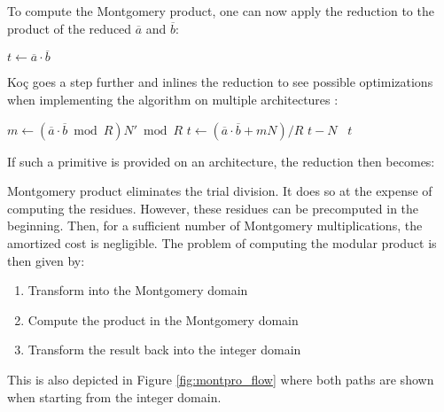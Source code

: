 To compute the Montgomery product, one can now apply the reduction to
the product of the reduced $\overline{a}$ and $\overline{b}$:
\begin{algorithmic}
    \State $t \gets \overline{a} \cdot \overline{b}$
    \State \Return {}
  \EndFunction
\end{algorithmic}

Ko\c{c} goes a step further and inlines the reduction to see possible
optimizations when implementing the algorithm on multiple
architectures \cite{Koc}:

\begin{algorithm}[hbt!]
  \begin{algorithmic}
      \State $m \gets (\overline{a} \cdot \overline{b} \bmod{R}) N' \bmod{R}$
      \State $t \gets (\overline{a} \cdot \overline{b} + m N)/R$
       \Return $t - N$
      \Else \, \Return $t$
      \EndIf 
   \EndFunction
  \end{algorithmic}
\end{algorithm}

If such a primitive is provided on an architecture, the reduction then
becomes:

\begin{algorithm}
  \begin{algorithmic}
      \State \Return {}
    \EndFunction
  \end{algorithmic}
\end{algorithm}

Montgomery product eliminates the trial division. It does so at the
expense of computing the residues. However, these residues can be
precomputed in the beginning. Then, for a sufficient number of
Montgomery multiplications, the amortized cost is negligible. The
problem of computing the modular product is then given by:
\begin{enumerate}
\item Transform into the Montgomery domain
\item Compute the product in the Montgomery domain
\item Transform the result back into the integer domain
\end{enumerate}
This is also depicted in Figure \ref{fig:montpro_flow} where both paths
are shown when starting from the integer domain.

